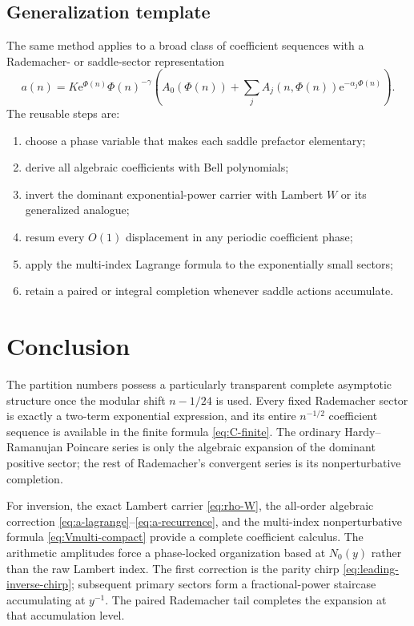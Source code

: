 \documentclass[11pt,a4paper]{article}
\numberwithin{equation}{section}
\theoremstyle{definition}
\theoremstyle{remark}
\newcommand{\e}{\mathrm e}
\begin{document}
\subsection{Generalization template}

The same method applies to a broad class of coefficient sequences with a
Rademacher- or saddle-sector representation
\begin{equation}\label{eq:general-template}
 a(n)=K\e^{\Phi(n)}\Phi(n)^{-\gamma}
 \left(A_0(\Phi(n))+\sum_jA_j(n,\Phi(n))\e^{-\alpha_j\Phi(n)}\right).
\end{equation}
The reusable steps are:
\begin{enumerate}[label=\arabic*.]
\item choose a phase variable that makes each saddle prefactor elementary;
\item derive all algebraic coefficients with Bell polynomials;
\item invert the dominant exponential-power carrier with Lambert $W$ or its
      generalized analogue;
\item resum every $O(1)$ displacement in any periodic coefficient phase;
\item apply the multi-index Lagrange formula to the exponentially small
      sectors;
\item retain a paired or integral completion whenever saddle actions
      accumulate.
\end{enumerate}

\section{Conclusion}

The partition numbers possess a particularly transparent complete asymptotic
structure once the modular shift $n-1/24$ is used.  Every fixed Rademacher
sector is exactly a two-term exponential expression, and its entire
$n^{-1/2}$ coefficient sequence is available in the finite formula
\eqref{eq:C-finite}.  The ordinary Hardy--Ramanujan Poincare series is only the
algebraic expansion of the dominant positive sector; the rest of Rademacher's
convergent series is its nonperturbative completion.

For inversion, the exact Lambert carrier \eqref{eq:rho-W}, the all-order
algebraic correction \eqref{eq:a-lagrange}--\eqref{eq:a-recurrence}, and the
multi-index nonperturbative formula \eqref{eq:Vmulti-compact} provide a complete
coefficient calculus.  The arithmetic amplitudes force a phase-locked
organization based at $N_0(y)$ rather than the raw Lambert index.  The first
correction is the parity chirp \eqref{eq:leading-inverse-chirp}; subsequent
primary sectors form a fractional-power staircase accumulating at $y^{-1}$.
The paired Rademacher tail completes the expansion at that accumulation level.
\end{document}
